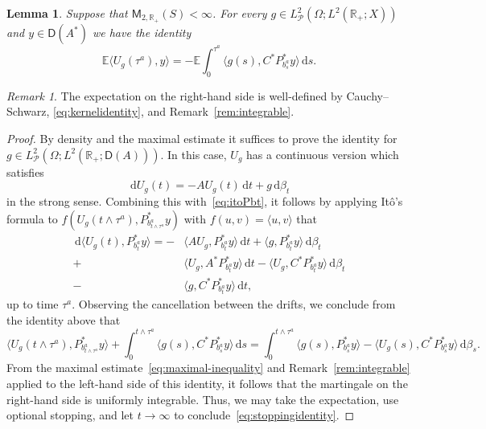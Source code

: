 \documentclass[11pt]{amsart}
\newtheorem{lemma}[theorem]{Lemma}
\theoremstyle{definition}
\theoremstyle{remark}
\newtheorem{remark}[theorem]{Remark}
\numberwithin{equation}{section}
\newcommand{\E}{\mathbb E}
\newcommand{\cP}{\mathcal P}
\newcommand{\R}{\mathbb R}
\newcommand{\1}{\mathbf 1}
\newcommand{\cM}{\mathsf{M}}
\newcommand{\cD}{\mathsf D}
\newcommand{\dd}{\,\mathrm d}
\begin{document}
\begin{lemma}
    \label{lem:stoppingidentity}
Suppose that $\cM_{2,\R_+}(S) < \infty$. 
    For every $g \in L^2_{\cP}(\Omega;L^2(\R_+;X))$ and $y \in \cD(A^*)$ we have the identity
    \begin{equation}
        \label{eq:stoppingidentity}
        \E \langle U_g (\tau^a), y\rangle = -\E\int_0^{\tau^a} \langle g(s), C^* P_{b^a_s}^*y\rangle \dd s.
    \end{equation}
\end{lemma}
\begin{remark}
    The expectation on the right-hand side is well-defined by Cauchy--Schwarz, \eqref{eq:kernelidentity}, and Remark~\ref{rem:integrable}.
\end{remark}

\begin{proof}
    By density and the maximal estimate it suffices to prove the identity for $g \in L^2_{\cP}(\Omega;L^2(\R_+;\cD(A)))$.
    In this case, $U_g$ has a continuous version which satisfies
    \begin{equation*}
        \dd U_g(t) =-A U_g(t) \dd t + g \dd\beta_t
    \end{equation*}
    in the strong sense.
    Combining this with~\eqref{eq:itoPbt}, it follows by applying It\^o's formula to $f(U_g(t \wedge \tau^a), P^*_{b^a_{t \wedge \tau^a}}y)$ with $f(u,v) = \langle u, v\rangle$  that
    \begin{equation*}
    \begin{aligned}
        \dd \langle U_g(t), P_{b^a_t}^*y\rangle = -&\langle A U_g, P_{b^a_t}^* y\rangle \dd t + \langle g, P_{b^a_t}^* y\rangle \dd \beta_t \\
        +& \langle U_g, A^* P^*_{b^a_t}y\rangle \dd t - \langle U_g, C^* P^*_{b^a_t}y\rangle \dd \beta_t \\
        -&\langle g, C^* P^*_{b^a_t}y \rangle \dd t,
    \end{aligned}
    \end{equation*}
    up to time $\tau^a$.
    Observing the cancellation between the drifts, we conclude from the identity above that
    \begin{equation*}
        \langle U_g(t \wedge \tau^a), P_{b^a_{t\wedge \tau^a}}^*y\rangle + \int_0^{t \wedge \tau^a} \langle g(s), C^* P^*_{b^a_s}y \rangle \dd s = 
        \int_0^{t \wedge \tau^a} \langle g(s), P_{b^a_s}^* y\rangle - \langle U_g(s), C^* P^*_{b^a_s}y\rangle \dd \beta_s.
    \end{equation*}
    From the maximal estimate~\eqref{eq:maximal-inequality} and Remark~\ref{rem:integrable} applied to the left-hand side of this identity, it follows that the martingale on the right-hand side is uniformly integrable. Thus, we may take the expectation, use optional stopping, and let $t\to \infty$ to conclude~\eqref{eq:stoppingidentity}.
\end{proof}
\end{document}
